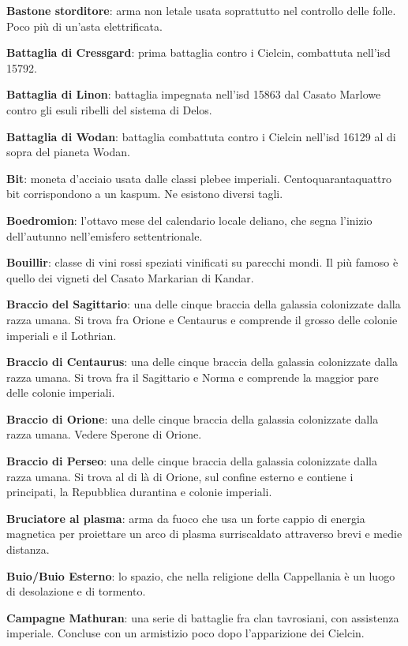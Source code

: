 \textbf{Bastone storditore}: arma non letale usata soprattutto nel
controllo delle folle. Poco più di un'asta elettrificata.

\textbf{Battaglia di Cressgard}: prima battaglia contro i Cielcin,
combattuta nell'\foreignlanguage{italian}{isd} 15792.

\textbf{Battaglia di Linon}: battaglia impegnata
nell'\foreignlanguage{italian}{isd} 15863 dal Casato Marlowe contro gli
esuli ribelli del sistema di Delos.

\textbf{Battaglia di Wodan}: battaglia combattuta contro i Cielcin
nell'\foreignlanguage{italian}{isd} 16129 al di sopra del pianeta Wodan.

\textbf{Bit}: moneta d'acciaio usata dalle classi plebee imperiali.
Centoquarantaquattro bit corrispondono a un kaspum. Ne esistono diversi
tagli.

\textbf{Boedromion}: l'ottavo mese del calendario locale deliano, che
segna l'inizio dell'autunno nell'emisfero settentrionale.

\textbf{Bouillir}: classe di vini rossi speziati vinificati su parecchi
mondi. Il più famoso è quello dei vigneti del Casato Markarian di
Kandar.

\textbf{Braccio del Sagittario}: una delle cinque braccia della galassia
colonizzate dalla razza umana. Si trova fra Orione e Centaurus e
comprende il grosso delle colonie imperiali e il Lothrian.

\textbf{Braccio di Centaurus}: una delle cinque braccia della galassia
colonizzate dalla razza umana. Si trova fra il Sagittario e Norma e
comprende la maggior pare delle colonie imperiali.

\textbf{Braccio di Orione}: una delle cinque braccia della galassia
colonizzate dalla razza umana. Vedere Sperone di Orione.

\textbf{Braccio di Perseo}: una delle cinque braccia della galassia
colonizzate dalla razza umana. Si trova al di là di Orione, sul confine
esterno e contiene i principati, la Repubblica durantina e colonie
imperiali.

\textbf{Bruciatore al plasma}: arma da fuoco che usa un forte cappio di
energia magnetica per proiettare un arco di plasma surriscaldato
attraverso brevi e medie distanza.

\textbf{Buio/Buio Esterno}: lo spazio, che nella religione della
Cappellania è un luogo di desolazione e di tormento.

\textbf{Campagne Mathuran}: una serie di battaglie fra clan tavrosiani,
con assistenza imperiale. Concluse con un armistizio poco dopo
l'apparizione dei Cielcin.


